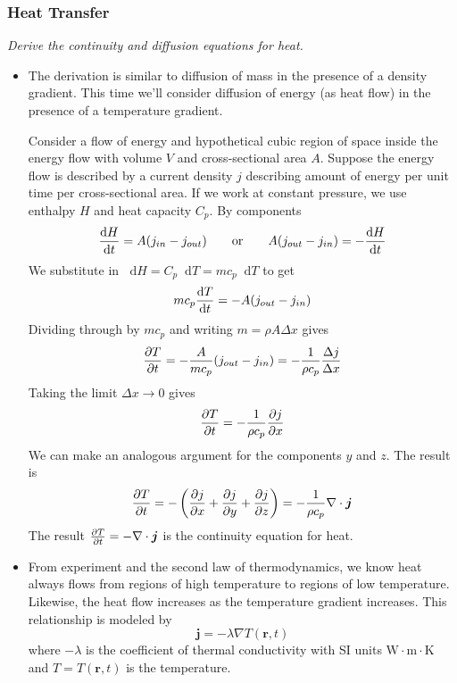 \documentclass[11pt, a4paper]{article}
\newcommand{\eqtext}[1]{\qquad \text{#1} \qquad}
\newcommand{\diff}{\mathop{}\!\mathrm{d}} %
\begin{document}
\subsubsection{Heat Transfer}
\textit{Derive the continuity and diffusion equations for heat.}
\begin{itemize}
	\item The derivation is similar to diffusion of mass in the presence of a density gradient. This time we'll consider diffusion of energy (as heat flow) in the presence of a temperature gradient.
	
	
	Consider a flow of energy and hypothetical cubic region of space inside the energy flow with volume $ V $ and cross-sectional area $ A $. Suppose the energy flow is described by a current density $ j $ describing amount of energy per unit time per cross-sectional area. If we work at constant pressure, we use enthalpy $ H $ and heat capacity $ C_{p} $. By components
	\begin{equation*}
		\dv{H}{t} = A(j_{in} - j_{out}) \eqtext{or} A(j_{out} - j_{in}) = - \dv{H}{t}
	\end{equation*}
	We substitute in $ \diff H = C_{p} \diff T = m c_{p} \diff T$  to get
	\begin{equation*}
		m c_{p}\dv{T}{t}= - A(j_{out} - j_{in})
	\end{equation*}
	Dividing through by $ m c_{p} $ and writing $ m = \rho A \Delta x $ gives
	\begin{equation*}
		\pdv{T}{t} = - \frac{A}{mc_{p}}(j_{out} - j_{in}) = -\frac{1}{\rho c_{p}} \frac{\Delta j}{\Delta x}
	\end{equation*}
	Taking the limit $ \Delta x \to 0 $ gives
	\begin{equation*}
		\pdv{T}{t} = -\frac{1}{\rho c_{p}} \pdv{j}{x}
	\end{equation*}
	We can make an analogous argument for the components $ y $ and $ z $. The result is
	\begin{equation*}
		\pdv{T}{t} = - \left(\pdv{j}{x} + \pdv{j}{y} + \pdv{j}{z}\right) = - \frac{1}{\rho c_{p}} \nabla \cdot \bm{j}
	\end{equation*}
	The result $ \pdv{T}{t} = - \nabla \cdot \bm{j} $ is the continuity equation for heat.
	
	\item From experiment and the second law of thermodynamics, we know heat always flows from regions of high temperature to regions of low temperature. Likewise, the heat flow increases as the temperature gradient increases. This relationship is modeled by
	\begin{equation*}
		\bm{j} = - \lambda \nabla T(\bm{r}, t)
	\end{equation*}
	where $ - \lambda $ is the coefficient of thermal conductivity with SI units $ \si{\watt \cdot \meter \cdot \kelvin} $ and $ T = T(\bm{r}, t) $ is the temperature.
	

\end{itemize}
\end{document}
